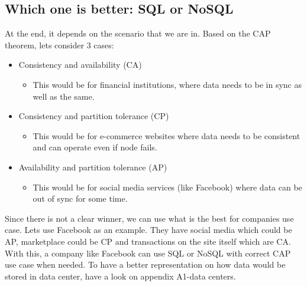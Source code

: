\subsection{Which one is better: SQL or NoSQL}
At the end, it depends on the scenario that we are in. Based on the CAP theorem, lets consider 3 cases:
\begin{itemize}
  \item Consistency and availability (CA)
      \begin{itemize}
        \item This would be for financial institutions, where data needs to be in sync as well as the same.
      \end{itemize}
  \item Consistency and partition tolerance (CP)
      \begin{itemize}
        \item This would be for e-commerce websites where data needs to be consistent and can operate even if node fails. 
      \end{itemize}
  \item Availability and partition tolerance (AP)
      \begin{itemize}
        \item This would be for social media services (like Facebook) where data can be out of sync for some time.
      \end{itemize}
\end{itemize}

Since there is not a clear winner, we can use what is the best for companies use case. Lets use Facebook as an example. They have social media which could be AP, marketplace could be CP and transactions on the site itself which are CA. With this, a company like Facebook can use SQL or NoSQL with correct CAP use case when needed. 
\newline
To have a better representation on how data would be stored in data center, have a look on appendix A1-data centers.
